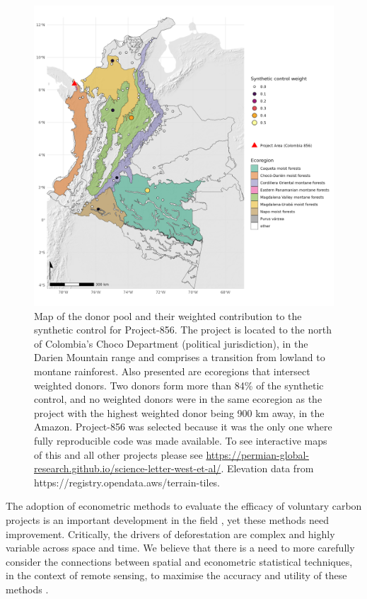\documentclass[
  number,
  3p]{elsarticle}
\begin{document}
\begin{figure}[H]

{\centering \includegraphics{figures/colombia_856_donors.png}

}

\caption{\label{fig-map}Map of the donor pool and their weighted
contribution to the synthetic control for Project-856. The project is
located to the north of Colombia's Choco Department (political
jurisdiction), in the Darien Mountain range and comprises a transition
from lowland to montane rainforest. Also presented are ecoregions
\citep{dinerstein_ecoregion-based_2017} that intersect weighted donors.
Two donors form more than 84\% of the synthetic control, and no weighted
donors were in the same ecoregion as the project with the highest
weighted donor being 900 km away, in the Amazon. Project-856 was
selected because it was the only one where fully reproducible code was
made available. To see interactive maps of this and all other projects
please see
\url{https://permian-global-research.github.io/science-letter-west-et-al/}.
Elevation data from https://registry.opendata.aws/terrain-tiles.}

\end{figure}

The adoption of econometric methods to evaluate the efficacy of
voluntary carbon projects is an important development in the field
\citep{balmford_realizing_2023}, yet these methods need improvement.
Critically, the drivers of deforestation are complex and highly variable
across space and time. We believe that there is a need to more carefully
consider the connections between spatial and econometric statistical
techniques, in the context of remote sensing, to maximise the accuracy
and utility of these methods \citep{garcia_conservation_2022}.
\end{document}
